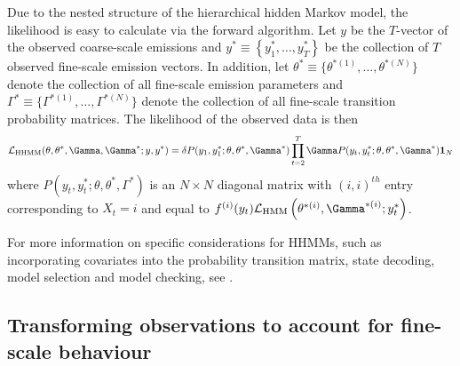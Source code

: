 Due to the nested structure of the hierarchical hidden Markov model, the likelihood is easy to calculate via the forward algorithm.
%
Let $y$ be the $T$-vector of the observed coarse-scale emissions and
$y^* \equiv \left\{y^*_1, \ldots,y^*_T\right\}$ be the collection of $T$ observed fine-scale emission vectors.
%
In addition, let $\theta^* \equiv \{\theta^{*(1)}, \ldots, \theta^{*(N)}\}$ denote the collection of all fine-scale emission parameters and $\Gamma^* \equiv \{\Gamma^{*(1)}, \ldots, \Gamma^{*(N)}\}$ denote the collection of all fine-scale transition probability matrices. The likelihood of the observed data is then
%
\begin{equation}
    \calL_{\text{HHMM}}(\theta,\theta^*,\Gamma,\Gamma^*;y,y^*) = \delta P(y_1,y_1^*;\theta,\theta^*,\Gamma^*) \prod_{t=2}^T \Gamma P(y_t,y_t^*;\theta,\theta^*,\Gamma^*) \mathbf{1}_N
    \label{eqn:HHMM_likelihood}
\end{equation}
%
where $P(y_t,y_t^*;\theta,\theta^*,\Gamma^*)$ is an $N \times N$ diagonal matrix with $(i,i)^{th}$ entry corresponding to $X_t=i$ and equal to 
$f^{(i)}(y_t)\calL_{\text{HMM}}\left(\theta^{*(i)},
\Gamma^{*(i)};y_t^*\right)$. 

For more information on specific considerations for HHMMs, such as incorporating covariates into the probability transition matrix, state decoding, model selection and model checking, see \citet{Adam:2019}. 

\subsection{Transforming observations to account for fine-scale behaviour}
\label{subsec:STFT}

